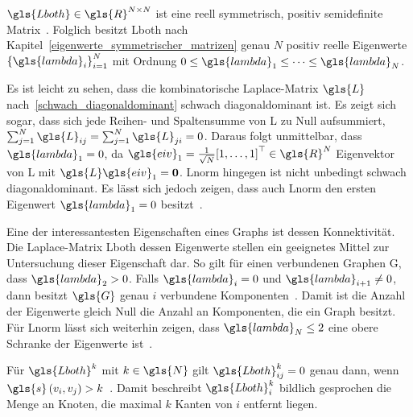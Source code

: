 $\gls{Lboth} \in \gls{R}^{N \times N}$ ist eine reell symmetrisch, positiv semidefinite Matrix~\cite{Chung}.
Folglich besitzt \gls{Lboth} nach Kapitel~\ref{eigenwerte_symmetrischer_matrizen} genau $N$ positiv reelle Eigenwerte ${\left\{\gls{lambda}_i\right\}}_{i=1}^N$ mit Ordnung $0 \leq \gls{lambda}_1 \leq \cdots \leq \gls{lambda}_N$.

Es ist leicht zu sehen, dass die kombinatorische Laplace-Matrix $\gls{L}$ nach~\eqref{schwach_diagonaldominant} schwach diagonaldominant ist.
Es zeigt sich sogar, dass sich jede Reihen- und Spaltensumme von \gls{L} zu Null aufsummiert, \dhe{} $\sum_{j=1}^N \gls{L}_{ij} = \sum_{j=1}^N \gls{L}_{ji} = 0$.
Daraus folgt unmittelbar, dass $\gls{lambda}_1 = 0$, da $\gls{eiv}_1 = \frac{1}{\sqrt{N}}{\left[1, \ldots, 1\right]}^{\top} \in \gls{R}^N$ Eigenvektor von \gls{L} mit $\gls{L}\gls{eiv}_1 = \ve{0}$.
\gls{Lnorm} hingegen ist nicht unbedingt schwach diagonaldominant.
Es lässt sich jedoch zeigen, dass auch \gls{Lnorm} den ersten Eigenwert $\gls{lambda}_1 = 0$ besitzt~\cite{Chung}.

Eine der interessantesten Eigenschaften eines Graphs ist dessen Konnektivität.
Die Laplace-Matrix \gls{Lboth} \bzw{} dessen Eigenwerte stellen ein geeignetes Mittel zur Untersuchung dieser Eigenschaft dar.
So gilt \zB{} für einen verbundenen Graphen \gls{G}, dass $\gls{lambda}_2 > 0$.
Falls $\gls{lambda}_i = 0$ und $\gls{lambda}_{i+1} \neq 0$, dann besitzt $\gls{G}$ genau $i$ verbundene Komponenten~\cite{Chung}.
Damit ist die Anzahl der Eigenwerte gleich Null die Anzahl an Komponenten, die ein Graph besitzt.
Für \gls{Lnorm} lässt sich weiterhin zeigen, dass $\gls{lambda}_N \leq 2$ eine obere Schranke der Eigenwerte ist~\cite{Chung}.

Für $\gls{Lboth}^{k}$ mit $k \in \gls{N}$ gilt $\gls{Lboth}^k_{ij} = 0$ genau dann, wenn $\gls{s}\left(v_i, v_j\right) > k$~\cite{Hammond}.
Damit beschreibt $\gls{Lboth}^k_i$ bildlich gesprochen die Menge an Knoten, die maximal $k$ Kanten von $i$ entfernt liegen.
